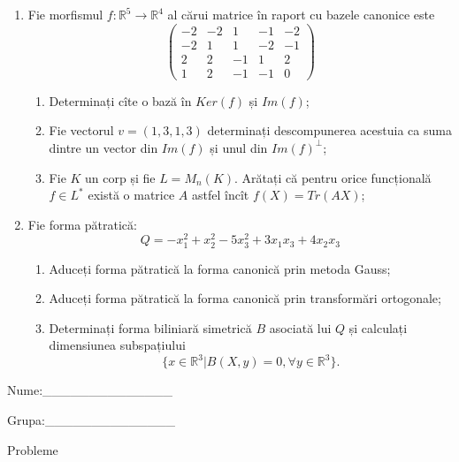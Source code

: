 \documentclass{article}
\begin{document}
\begin{enumerate}
 \item Fie morfismul $f:\mathbb{R}^5 \to \mathbb{R}^4$ al cărui matrice în raport cu bazele canonice este
$$\begin{pmatrix}
-2&-2&1&-1&-2\\
-2&1&1&-2&-1\\
2&2&-1&1&2\\
1&2&-1&-1&0
\end{pmatrix}$$

\begin{enumerate}
\item Determinați cîte o bază în $Ker(f)$ și $Im(f)$;
\item Fie vectorul $v=(1,3,1,3)$ determinați descompunerea acestuia ca suma dintre un vector din $Im(f)$ și unul din $Im(f)^\perp$;
\item Fie $K$ un corp și fie $L=M_n(K)$. Arătați că pentru orice funcțională $f \in L^*$ există o matrice $A$ astfel încît $f(X)=Tr(AX)$;
\end{enumerate}
\item Fie forma pătratică:
$$Q= -x_1^2+x_2^2-5x_3^2+3x_1x_3+4x_2x_3$$

\begin{enumerate}
\item Aduceți forma pătratică la forma canonică prin metoda Gauss;
\item Aduceți forma pătratică la forma canonică prin transformări ortogonale;
\item Determinați forma biliniară simetrică $B$ asociată lui $Q$ și calculați dimensiunea subspațiului
$$\{x \in \mathbb{R}^3 | B(X,y)=0,\forall y \in \mathbb{R}^3\}.$$

\end{enumerate}
\end{enumerate}
\newpage
\begin{flushright}
Nume:\_\_\_\_\_\_\_\_\_\_\_\_\_\_
 
 
Grupa:\_\_\_\_\_\_\_\_\_\_\_\_\_\_
\end{flushright}
\begin{center}
\vspace{2cm}
{\Large Probleme}
\vspace{2cm}
\end{center}
\end{document}
